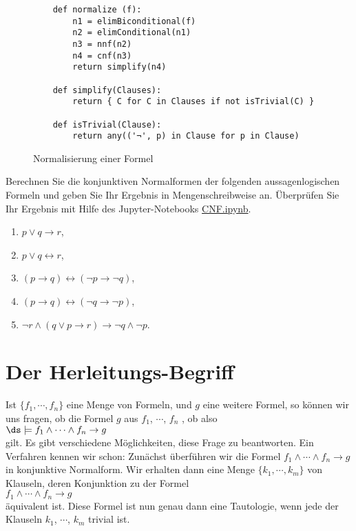 \begin{figure}[!ht]
  \centering
\begin{verbatim}
    def normalize (f):
        n1 = elimBiconditional(f)
        n2 = elimConditional(n1)
        n3 = nnf(n2)
        n4 = cnf(n3)
        return simplify(n4)
    
    def simplify(Clauses):
        return { C for C in Clauses if not isTrivial(C) }
    
    def isTrivial(Clause):
        return any(('¬', p) in Clause for p in Clause)
\end{verbatim} 
\vspace*{-0.3cm}
  \caption{Normalisierung einer Formel}
  \label{fig:normalize}
\end{figure}

\exercise
Berechnen Sie die konjunktiven Normalformen der folgenden aussagenlogischen Formeln und geben Sie Ihr Ergebnis
in Mengenschreibweise an.  Überprüfen Sie Ihr Ergebnis mit Hilfe des Jupyter-Notebooks 
\href{https://github.com/karlstroetmann/Logic/blob/master/Python/CNF.ipynb}{CNF.ipynb}.
\begin{enumerate}
\item $p \vee q \rightarrow r$,
\item $p \vee q \leftrightarrow r$,
\item $(p \rightarrow q) \leftrightarrow (\neg p \rightarrow \neg q)$,
\item $(p \rightarrow q) \leftrightarrow (\neg q \rightarrow \neg p)$,
\item $\neg r \wedge (q \vee p \rightarrow r) \rightarrow \neg q \wedge \neg p$.
\end{enumerate}


\section{Der Herleitungs-Begriff}
Ist $\{f_1,\cdots,f_n\}$ eine Menge von Formeln, und $g$ eine weitere Formel, so
können wir uns fragen, ob  die  Formel $g$ aus $f_1$, $\cdots$, $f_n$ , ob
also 
\\[0.2cm]
\hspace*{1.3cm}
$\ds \models f_1 \wedge \cdots \wedge f_n \rightarrow g$
\\[0.2cm]
gilt.
Es gibt verschiedene Möglichkeiten, diese Frage zu beantworten.  Ein Verfahren kennen wir
schon: Zunächst überführen wir die Formel  $f_1 \wedge \cdots \wedge f_n \rightarrow g$ in
konjunktive Normalform.  Wir erhalten dann eine Menge
$\{k_1,\cdots,k_m\}$ von Klauseln, deren Konjunktion zu der  Formel
\\[0.2cm]
\hspace*{1.3cm}
$f_1 \wedge \cdots \wedge f_n \rightarrow g$
\\[0.2cm] 
äquivalent ist.  Diese Formel ist nun genau dann eine Tautologie, wenn
jede der Klauseln $k_1$, $\cdots$, $k_m$ trivial ist.  

